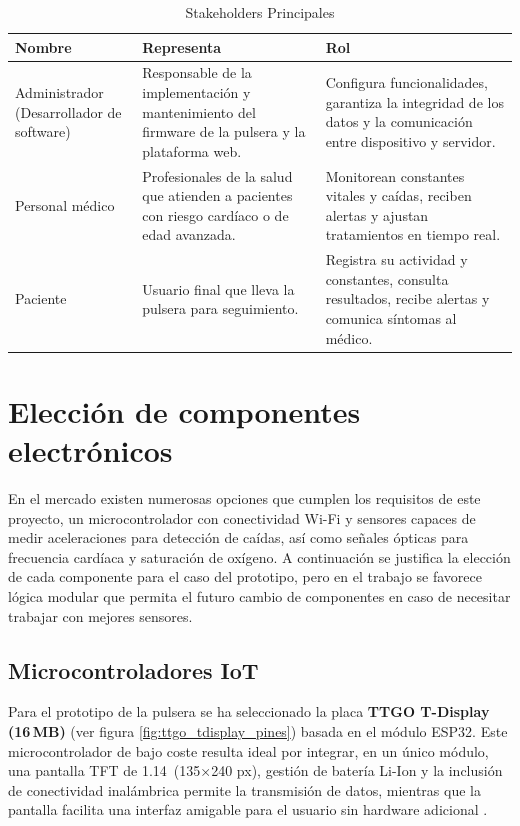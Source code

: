 \documentclass[12pt, a4paper]{article}
\begin{document}
		\begin{table}[ht]
			\centering
			\caption{Stakeholders Principales}
			\begin{tabular}{|p{3cm}|p{6cm}|p{7cm}|}
				\hline
				\textbf{Nombre} & \textbf{Representa} & \textbf{Rol} \\ 
				\hline
				Administrador (Desarrollador de software) &
				Responsable de la implementación y mantenimiento del firmware de la pulsera y la plataforma web. &
				Configura funcionalidades, garantiza la integridad de los datos y la comunicación entre dispositivo y servidor. \\
				\hline
				Personal médico &
				Profesionales de la salud que atienden a pacientes con riesgo cardíaco o de edad avanzada. &
				Monitorean constantes vitales y caídas, reciben alertas y ajustan tratamientos en tiempo real. \\
				\hline
				Paciente &
				Usuario final que lleva la pulsera para seguimiento. &
				Registra su actividad y constantes, consulta resultados, recibe alertas y comunica síntomas al médico. \\
				\hline
			\end{tabular}
		\end{table}
	
	\section{Elección de componentes electrónicos}
	
	
	En el mercado existen numerosas opciones que cumplen los requisitos de este proyecto, un microcontrolador con conectividad Wi-Fi y sensores capaces de medir aceleraciones para detección de caídas, así como señales ópticas para frecuencia cardíaca y saturación de oxígeno. A continuación se justifica la elección de cada componente para el caso del prototipo, pero en el trabajo se favorece lógica modular que permita el futuro cambio de componentes en caso de necesitar trabajar con mejores sensores.
	
	\subsection{Microcontroladores IoT}
	
	Para el prototipo de la pulsera se ha seleccionado la placa \textbf{TTGO T-Display (16\,MB)} (ver figura \ref{fig:ttgo_tdisplay_pines}) basada en el módulo ESP32. Este microcontrolador de bajo coste resulta ideal por integrar, en un único módulo, una pantalla TFT de 1.14\,\textquotedbl{} (135×240 px), gestión de batería Li-Ion y la inclusión de conectividad inalámbrica permite la transmisión de datos, mientras que la pantalla facilita una interfaz amigable para el usuario sin hardware adicional \cite{TTGO2021}.
	
\end{document}

